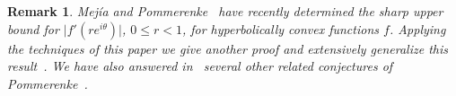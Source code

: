\documentclass{lms}
\newcommand{\abs}[1]{\lvert#1\rvert}
\newtheorem{remark}[theorem]{Remark}
\numberwithin{equation}{section}
\begin{document}
\begin{remark}
Mej\'ia and Pommerenke~\cite{MPV01}  have recently determined the 
sharp upper bound 
for $\abs{f'(re^{i\theta})}$, $0\leq r <1$, for
 hyperbolically convex functions $f$.
Applying the techniques of this paper we give another proof and
extensively generalize this result~\cite{BOP03}.
We have also answered in~\cite{BPW04} several other related conjectures of 
Pommerenke~\cite{pomm1}.


\end{remark}

% 

\def\cprime{$'$}
\providecommand{\bysame}{\leavevmode\hbox to3em{\hrulefill}\thinspace}
\providecommand{\MR}{\relax\ifhmode\unskip\space\fi MR }
\providecommand{\MRhref}[2]{%
  \href{http://www.ams.org/mathscinet-getitem?mr=#1}{#2}
}
\providecommand{\href}[2]{#2}
\end{document}
